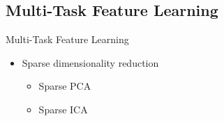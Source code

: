 \documentclass[first=dgreen,second=purple,logo=yellowexc]{aaltoslides}
\newcommand{\yb}{{\bf y}}
\newcommand{\wb}{{\bf w}}
\begin{document}


\subsection{Multi-Task Feature Learning}
\begin{frame}{Multi-Task Feature Learning \cite{Argyriou07multi-taskfeature}}
\begin{itemize}
    \item Sparse dimensionality reduction
    \begin{itemize}
        \item Sparse PCA
        \item Sparse ICA
    \end{itemize}
\end{itemize}
\end{frame}
\end{document}
